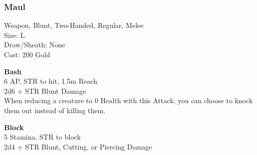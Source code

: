 \subsubsection{Maul}\label{weapon:maul}
Weapon, Blunt, Two-Handed, Regular, Melee\\
Size: L\\
Draw/Sheath: None\\
Cost: 200 Gold

\textbf{Bash}\\
6 AP, STR to hit, 1.5m Reach\\
2d6 + STR Blunt Damage\\
When reducing a creature to 0 Health with this Attack, you can choose to knock them out instead of killing them.

\textbf{Block}\\
5 Stamina, STR to block\\
2d4 + \texttimes STR Blunt, Cutting, or Piercing Damage